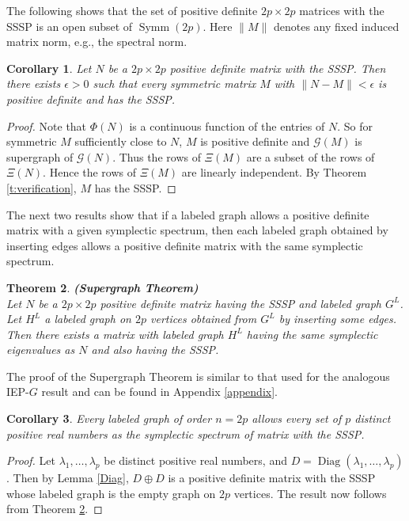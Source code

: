 \documentclass[12pt]{article}
\newtheorem{thm}{Theorem}[section]
\newtheorem{cor}[thm]{Corollary}
\theoremstyle{definition}
\theoremstyle{definition}
\theoremstyle{definition}
\numberwithin{figure}{section}
\numberwithin{equation}{section}
\newcommand{\G}{\mathcal{G}}
\newcommand{\symm}{\operatorname{Symm}}
\newcommand{\diag}{\operatorname{Diag}}
\newcommand{\lam}{\lambda}
\begin{document}
The following shows that the set of positive definite $2p\times 2p$ matrices with the SSSP is an open subset of {$\symm(2p)$}. 
Here $\| M\|$ denotes any fixed 
induced matrix norm, e.g., the spectral norm.

\begin{cor}
\label{open}
Let $N$ be a $2p\times 2p$ positive definite matrix with the SSSP.
Then there exists $\epsilon>0$  such that every {symmetric} matrix   $M$ with 
 $\|N-M \|<\epsilon$ is positive definite and has the SSSP. 
\end{cor}

\begin{proof}
Note that  $\Phi(N)$ is a 
continuous function of the entries of $N$.
So for symmetric $M$ sufficiently close to $N$, 
$M$ is positive definite and $\G(M)$ is supergraph of $\G(N)$. Thus the rows of $\Xi(M)$ 
are a subset of the rows of $\Xi(N)$. 
Hence the rows of $\Xi(M)$ are linearly independent.  
By Theorem \ref{t:verification}, $M$ has the SSSP. 
\end{proof}

The next two results show that if a labeled graph allows a positive definite matrix 
with a given symplectic spectrum, then each labeled graph obtained by inserting edges allows a 
positive definite matrix with the same symplectic spectrum. 

\begin{thm}{\rm \bf (Supergraph Theorem)}
\label{supergraph}
\\
Let $N$ be a  $2p\times 2p$ positive definite matrix having the SSSP and   labeled graph $G^L$. 
Let $H^L$ a labeled graph on $2p$ vertices obtained from $G^L$ by inserting some edges.
Then there exists a matrix  with  
labeled graph $H^L$ having the same symplectic eigenvalues as $N$ and also having the SSSP.
\end{thm}

The proof of the Supergraph Theorem is similar to that used for the analogous IEP-$G$ result and can be found in Appendix \ref{appendix}.


\begin{cor}\label{AllSimple}
    Every labeled graph of order $n=2p$ allows 
    every set of $p$ distinct positive real numbers as the symplectic spectrum of matrix with the SSSP.
\end{cor}
\begin{proof}
Let $\lam_1, \ldots, \lam_p$ be distinct positive real numbers, and $D= \diag(\lam_1, \ldots, \lam_p)$.
Then by Lemma \ref{Diag}, $D \oplus D$ is a positive definite matrix with the SSSP whose labeled graph is 
the empty graph on $2p$ vertices.  The result now follows from Theorem \ref{supergraph}.
\end{proof}
\end{document}
